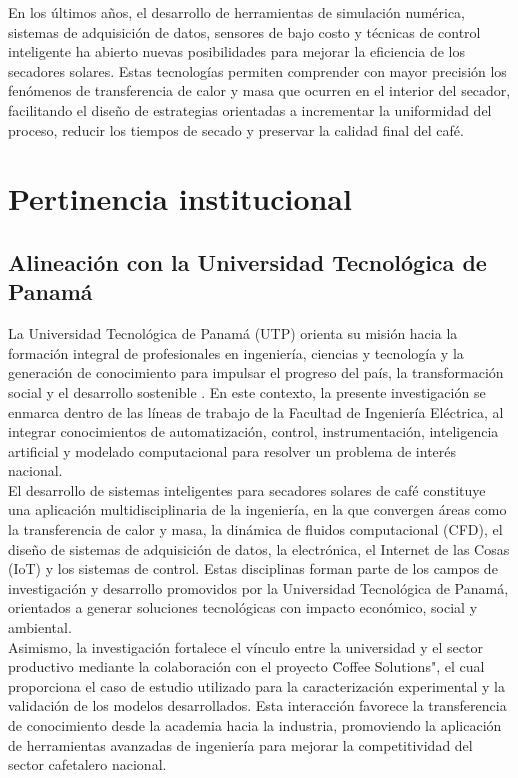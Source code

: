 En los últimos años, el desarrollo de herramientas de simulación numérica, sistemas de adquisición de datos, sensores de bajo costo y técnicas de control inteligente ha abierto nuevas posibilidades para mejorar la eficiencia de los secadores solares. Estas tecnologías permiten comprender con mayor precisión los fenómenos de transferencia de calor y masa que ocurren en el interior del secador, facilitando el diseño de estrategias orientadas a incrementar la uniformidad del proceso, reducir los tiempos de secado y preservar la calidad final del café.\\


\section{Pertinencia institucional}
\subsection{Alineación con la Universidad Tecnológica de Panamá}
La Universidad Tecnológica de Panamá (UTP) orienta su misión hacia la formación integral de profesionales en ingeniería, ciencias y tecnología y la generación de conocimiento para impulsar el progreso del país, la transformación social y el desarrollo sostenible \parencite{utp2026}. En este contexto, la presente investigación se enmarca dentro de las líneas de trabajo de la Facultad de Ingeniería Eléctrica, al integrar conocimientos de automatización, control, instrumentación, inteligencia artificial y modelado computacional para resolver un problema de interés nacional.\\

El desarrollo de sistemas inteligentes para secadores solares de café constituye una aplicación multidisciplinaria de la ingeniería, en la que convergen áreas como la transferencia de calor y masa, la dinámica de fluidos computacional (CFD), el diseño de sistemas de adquisición de datos, la electrónica, el Internet de las Cosas (IoT) y los sistemas de control. Estas disciplinas forman parte de los campos de investigación y desarrollo promovidos por la Universidad Tecnológica de Panamá, orientados a generar soluciones tecnológicas con impacto económico, social y ambiental.\\

Asimismo, la investigación fortalece el vínculo entre la universidad y el sector productivo mediante la colaboración con el proyecto \" Coffee Solutions", el cual proporciona el caso de estudio utilizado para la caracterización experimental y la validación de los modelos desarrollados. Esta interacción favorece la transferencia de conocimiento desde la academia hacia la industria, promoviendo la aplicación de herramientas avanzadas de ingeniería para mejorar la competitividad del sector cafetalero nacional.\\

